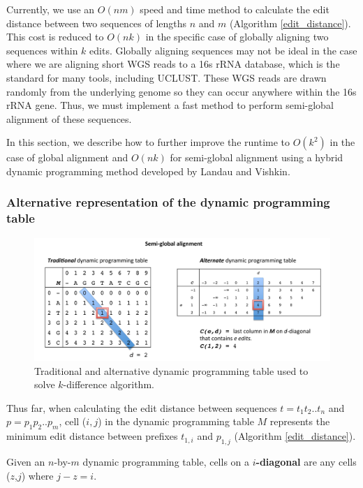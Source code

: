 Currently, we use an $O(nm)$ speed and time method to calculate the edit distance between two sequences of lengths $n$ and $m$ (Algorithm \ref{edit_distance}).
This cost is reduced to $O(nk)$ in the specific case of globally aligning two sequences within $k$ edits.
Globally aligning sequences may not be ideal in the case where we are aligning short WGS reads to a 16s rRNA database, which is the standard for many tools, including UCLUST.
These WGS reads are drawn randomly from the underlying genome so they can occur anywhere within the 16s rRNA gene.
Thus, we must implement a fast method to perform semi-global alignment of these sequences.

In this section, we describe how to further improve the runtime to $O(k^2)$ in the case of global alignment and $O(nk)$ for semi-global alignment using a hybrid dynamic programming method developed by Landau and Vishkin\cite{landau_introducing_1986}.

\subsubsection{Alternative representation of the dynamic programming table}

\begin{figure}[tb]
  \centering
    \includegraphics[width=1.0\textwidth]{alternate_table}
  \caption{Traditional and alternative dynamic programming table used to solve $k$-difference algorithm.}
  \label{fig:alternate_table}
\end{figure}
Thus far, when calculating the edit distance between sequences $t = t_1 t_2 .. t_n$ and $p = p_1 p_2 .. p_m$, cell ($i,j$) in the dynamic programming table $M$ represents the minimum edit distance between prefixes $t_{1,i}$ and $p_{1,j}$ (Algorithm \ref{edit_distance}).

\begin{definition}
Given an $n$-by-$m$ dynamic programming table, cells on a {\bf $i$-diagonal} are any cells ($z$,$j$) where $j-z=i$.
\end{definition}

